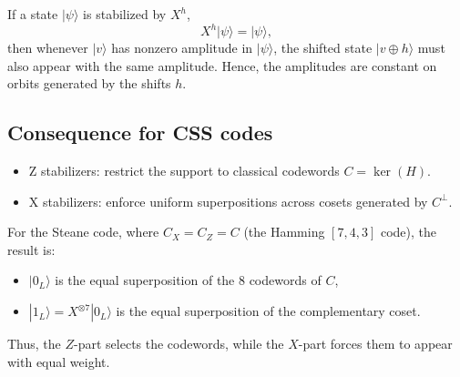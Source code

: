 If a state \(|\psi\rangle\) is stabilized by \(X^h\),
\[
X^h |\psi\rangle = |\psi\rangle,
\]
then whenever \(|v\rangle\) has nonzero amplitude in \(|\psi\rangle\), the shifted state \(|v\oplus h\rangle\) must also appear with the same amplitude. Hence, the amplitudes are constant on orbits generated by the shifts \(h\).


\subsection{Consequence for CSS codes}

\begin{itemize}
\item Z stabilizers: restrict the support to classical codewords \(C = \ker(H)\).
\item X stabilizers: enforce uniform superpositions across cosets generated by \(C^\perp\).
\end{itemize}


For the Steane code, where \(C_X = C_Z = C\) (the Hamming \([7,4,3]\) code), the result is:
\begin{itemize}
    \item \(|0_L\rangle\) is the equal superposition of the 8 codewords of \(C\),
    \item \(|1_L\rangle = X^{\otimes 7}|0_L\rangle\) is the equal superposition of the complementary coset.
\end{itemize}
Thus, the \(Z\)-part selects the codewords, while the \(X\)-part forces them to appear with equal weight.
